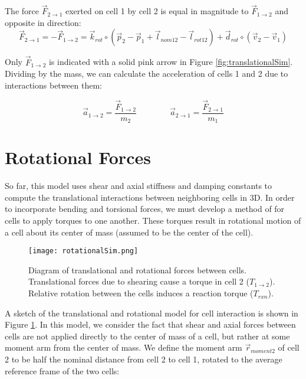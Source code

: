 {The force $\vec{F}_{2\rightarrow1}$ exerted on cell 1 by cell 2 is equal in magnitude to $\vec{F}_{1\rightarrow2}$ and opposite in direction:
 \begin{equation} \label{eq:translationalEqOpp}
  \vec{F}_{2\rightarrow1} = -\vec{F}_{1\rightarrow2} = \vec{k}_{rot} \circ (\vec{p}_2 - \vec{p}_1 + \vec{l}_{nom12}-\vec{l}_{rot12}) + \vec{d}_{rot} \circ (\vec{v}_2 - \vec{v}_1)
  \end{equation}

Only $\vec{F}_{1\rightarrow2}$ is indicated with a solid pink arrow in Figure \ref{fig:translationalSim}.\\

Dividing by the mass, we can calculate the acceleration of cells 1 and 2 due to interactions between them:

 \[ \vec{a}_{1\rightarrow2} = \dfrac{\vec{F}_{1\rightarrow2}}{m_2} 
  \qquad\qquad
   \vec{a}_{2\rightarrow1} = \dfrac{\vec{F}_{2\rightarrow1}}{m_1} 
  \]

\section{Rotational Forces}

So far, this model uses shear and axial stiffness and damping constants to compute the translational interactions between neighboring cells in 3D.  In order to incorporate bending and torsional forces, we must develop a method of for cells to apply torques to one another.  These torques result in rotational motion of a cell about its center of mass (assumed to be the center of the cell).\\

\begin{figure}
  \texttt{[image: rotationalSim.png]}
  \caption{Diagram of translational and rotational forces between cells.  Translational forces due to shearing cause a torque in cell 2 ($T_{1\rightarrow2}$).  Relative rotation between the cells induces a reaction torque ($T_{rxn}$).}
  \label{fig:rotationalSim}
\end{figure}

A sketch of the translational and rotational model for cell interaction is shown in Figure \ref{fig:rotationalSim}.  In this model, we consider the fact that shear and axial forces between cells are not applied directly to the center of mass of a cell, but rather at some moment arm from the center of mass.  We define the moment arm $\vec{r}_{moment2}$ of cell 2 to be half the nominal distance from cell 2 to cell 1, rotated to the average reference frame of the two cells:

}
